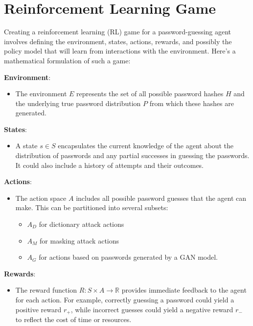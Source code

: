 \section{Reinforcement Learning Game}

Creating a reinforcement learning (RL) game for a password-guessing
agent involves defining the environment, states, actions, rewards, and
possibly the policy model that will learn from interactions with the
environment. Here's a mathematical formulation of such a game:

\textbf{Environment}:

\begin{itemize}
\item
  The environment \(E\) represents the set of all possible password
  hashes \(H\) and the underlying true password distribution \(P\) from
  which these hashes are generated.
\end{itemize}

\textbf{States}:

\begin{itemize}
\item
  A state \(s \in S\) encapsulates the current knowledge of the agent
  about the distribution of passwords and any partial successes in
  guessing the passwords. It could also include a history of attempts
  and their outcomes.
\end{itemize}

\textbf{Actions}:

\begin{itemize}
\item
  The action space \(A\) includes all possible password guesses that the
  agent can make. This can be partitioned into several subsets:

  \begin{itemize}
  \item
    \(A_D\) for dictionary attack actions
  \item
    \(A_M\) for masking attack actions
  \item
    \(A_G\) for actions based on passwords generated by a GAN model.
  \end{itemize}
\end{itemize}

\textbf{Rewards}:

\begin{itemize}
\item
  The reward function \(R: S \times A \rightarrow \mathbb{R}\) provides
  immediate feedback to the agent for each action. For example,
  correctly guessing a password could yield a positive reward \(r_+\),
  while incorrect guesses could yield a negative reward \(r_-\) to
  reflect the cost of time or resources.
\end{itemize}


